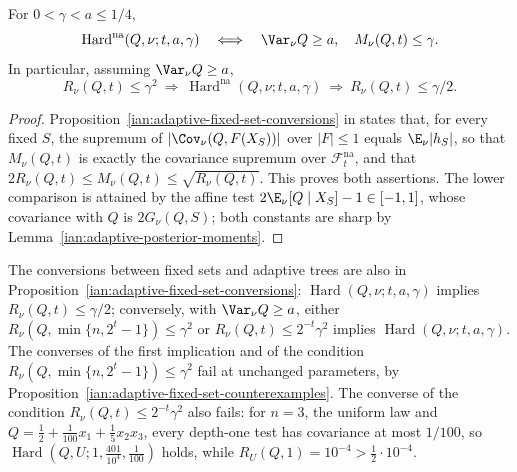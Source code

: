 \begin{corollary}
\label{ian:fixed-set-hardness-duality}
For \(0<\gamma<a\le1/4\),
\[
 \operatorname{Hard}^{\mathrm{na}}(Q,\nu;t,a,\gamma)
 \quad\Longleftrightarrow\quad
 \Var_\nu Q\ge a,\quad M_\nu(Q,t)\le\gamma.
\]
In particular, assuming \(\Var_\nu Q\ge a\),
\[
 R_\nu(Q,t)\le\gamma^2
 \ \Longrightarrow\
 \operatorname{Hard}^{\mathrm{na}}(Q,\nu;t,a,\gamma)
 \ \Longrightarrow\
 R_\nu(Q,t)\le\gamma/2.
\]
\end{corollary}

\begin{proof}
Proposition~\ref{ian:adaptive-fixed-set-conversions} in
 states that, for every fixed
\(S\), the supremum of \(|\Cov_\nu(Q,F(X_S))|\) over \(|F|\le1\) equals
\(\E_\nu|h_S|\), so that \(M_\nu(Q,t)\) is exactly the covariance
supremum over \(\mathcal F_t^{\mathrm{na}}\), and that
\(2R_\nu(Q,t)\le M_\nu(Q,t)\le\sqrt{R_\nu(Q,t)}\). This proves both
assertions. The lower comparison is attained by the affine test
\(2\E_\nu[Q\mid X_S]-1\in[-1,1]\), whose covariance with \(Q\) is
\(2G_\nu(Q,S)\); both constants are sharp by
Lemma~\ref{ian:adaptive-posterior-moments}.
\end{proof}

The conversions between fixed sets and adaptive trees are also in
Proposition~\ref{ian:adaptive-fixed-set-conversions}:
\(\operatorname{Hard}(Q,\nu;t,a,\gamma)\) implies \(R_\nu(Q,t)\le\gamma/2\);
conversely, with \(\Var_\nu Q\ge a\), either
\(R_\nu(Q,\min\{n,2^t-1\})\le\gamma^2\) or \(R_\nu(Q,t)\le2^{-t}\gamma^2\)
implies \(\operatorname{Hard}(Q,\nu;t,a,\gamma)\). The converses of
the first implication and of the condition
\(R_\nu(Q,\min\{n,2^t-1\})\le\gamma^2\) fail at unchanged parameters, by
Proposition~\ref{ian:adaptive-fixed-set-counterexamples}. The converse
of the condition \(R_\nu(Q,t)\le2^{-t}\gamma^2\) also fails: for \(n=3\),
the uniform law and \(Q=\frac12+\frac1{100}x_1+\frac15x_2x_3\), every
depth-one test has covariance at most \(1/100\), so
\(\operatorname{Hard}(Q,U;1,\frac{401}{10^4},\frac1{100})\) holds, while
\(R_U(Q,1)=10^{-4}>\frac12\cdot10^{-4}\).

